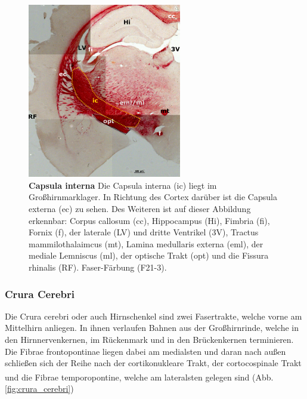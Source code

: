 \documentclass[12pt,a4paper,pdftex]{article}
\begin{document}
\begin{figure}[H]
    \centering
    \includegraphics[width=0.6\textwidth]{pictures/Bilder_Laura/internal_capsule_F21_3P_025x.png}
    \caption[Capsula interna]{\textbf{Capsula interna} Die Capsula interna (ic) liegt im Großhirnmarklager. In Richtung des Cortex darüber ist die Capsula externa (ec) zu sehen. Des Weiteren ist auf dieser Abbildung erkennbar: Corpus callosum (cc), Hippocampus (Hi), Fimbria (fi), Fornix (f), der laterale (LV) und dritte Ventrikel (3V), Tractus mammilothalaimcus (mt), Lamina medullaris externa (eml), der mediale Lemniscus (ml), der optische Trakt (opt) und die Fissura rhinalis (RF). Faser-Färbung (F21-3).}
    \label{fig:Capsula_interna}
\end{figure}


\subsubsection*{Crura Cerebri} 
Die Crura cerebri oder auch Hirnschenkel sind zwei Fasertrakte, welche vorne am Mittelhirn anliegen. In ihnen verlaufen Bahnen aus der Großhirnrinde, welche in den Hirnnervenkernen, im Rückenmark und in den Brückenkernen terminieren. Die Fibrae frontopontinae liegen dabei am medialsten und daran nach außen schließen sich der Reihe nach der cortikonukleare Trakt, der cortocospinale Trakt und die Fibrae temporopontine, welche am lateralsten gelegen sind \textsuperscript{\cite[6]{trepel2011neuroanatomie}} (Abb. \ref{fig:crura_cerebri})
\end{document}
